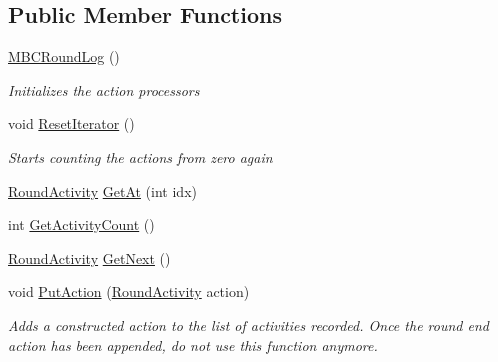\subsection*{Public Member Functions}
\begin{DoxyCompactItemize}
\item 
\hypertarget{class_m_b_c_core_1_1_m_b_c_round_log_ad8a9d2f54271b5cf4bda7f46162208a0}{\hyperlink{class_m_b_c_core_1_1_m_b_c_round_log_ad8a9d2f54271b5cf4bda7f46162208a0}{M\-B\-C\-Round\-Log} ()}\label{class_m_b_c_core_1_1_m_b_c_round_log_ad8a9d2f54271b5cf4bda7f46162208a0}

\begin{DoxyCompactList}\small\item\em Initializes the action processors\end{DoxyCompactList}\item 
\hypertarget{class_m_b_c_core_1_1_m_b_c_round_log_a443bf85cc41f7e11a02f004821126e23}{void \hyperlink{class_m_b_c_core_1_1_m_b_c_round_log_a443bf85cc41f7e11a02f004821126e23}{Reset\-Iterator} ()}\label{class_m_b_c_core_1_1_m_b_c_round_log_a443bf85cc41f7e11a02f004821126e23}

\begin{DoxyCompactList}\small\item\em Starts counting the actions from zero again\end{DoxyCompactList}\item 
\hyperlink{class_m_b_c_core_1_1_m_b_c_round_log_1_1_round_activity}{Round\-Activity} \hyperlink{class_m_b_c_core_1_1_m_b_c_round_log_ac6ca332b6890d6793a9ef0b392e52bf4}{Get\-At} (int idx)
\item 
int \hyperlink{class_m_b_c_core_1_1_m_b_c_round_log_a921bb7952e231ff4b0da4943e2e26092}{Get\-Activity\-Count} ()
\item 
\hyperlink{class_m_b_c_core_1_1_m_b_c_round_log_1_1_round_activity}{Round\-Activity} \hyperlink{class_m_b_c_core_1_1_m_b_c_round_log_a3d610ad4ee6d9de87ab8791896117af7}{Get\-Next} ()
\item 
\hypertarget{class_m_b_c_core_1_1_m_b_c_round_log_ace09691e60532dc0172ee227445d20d2}{void \hyperlink{class_m_b_c_core_1_1_m_b_c_round_log_ace09691e60532dc0172ee227445d20d2}{Put\-Action} (\hyperlink{class_m_b_c_core_1_1_m_b_c_round_log_1_1_round_activity}{Round\-Activity} action)}\label{class_m_b_c_core_1_1_m_b_c_round_log_ace09691e60532dc0172ee227445d20d2}

\begin{DoxyCompactList}\small\item\em Adds a constructed action to the list of activities recorded. Once the round end action has been appended, do not use this function anymore.\end{DoxyCompactList}\end{DoxyCompactItemize}


